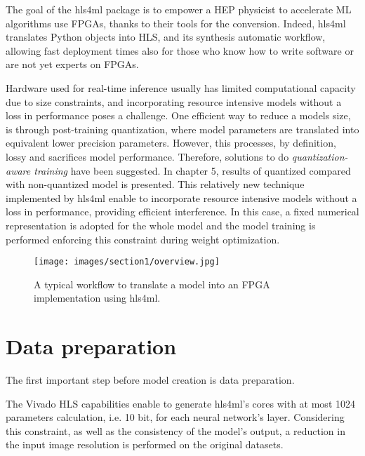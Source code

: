 \documentclass{article}
\begin{document}
\par The goal of the hls4ml package is to empower a HEP physicist to accelerate
ML algorithms use FPGAs, thanks to their tools for the conversion. 
Indeed, hls4ml translates Python objects into HLS, and its
synthesis automatic workflow, allowing fast deployment times also for
those who know how to write software or are not yet experts on FPGAs.

\par Hardware used for real-time inference usually has limited computational capacity due to size constraints, 
and incorporating resource intensive models without a loss in performance poses a challenge.
One efficient way to reduce a models size, is through post-training
quantization, where model parameters are translated
into equivalent lower precision parameters.
However, this processes, by definition, lossy and sacrifices model performance. 
Therefore, solutions to do \textit{quantization-aware training} have been suggested.
In chapter 5, results of quantized compared with non-quantized model is presented.
This relatively new technique implemented by hls4ml enable to incorporate resource intensive models without
a loss in performance, providing efficient interference. 
In this case, a fixed numerical representation is adopted for the whole model and the model training is performed
enforcing this constraint during weight optimization.


\begin{figure}[H]
  \centering
  \texttt{[image: images/section1/overview.jpg]}
  \caption{A typical workflow to translate a model into an FPGA implementation using hls4ml.}
  \label{fig:overview}
\end{figure}



\section{Data preparation}
The first important step before model creation is data preparation.
\par The Vivado HLS capabilities enable to generate hls4ml's cores with 
at most 1024 parameters calculation, i.e. 10 bit, for each neural network's layer. 
Considering this constraint, as well as the consistency of the model's output,
a reduction in the input image resolution is performed on the original datasets. 
\end{document}
